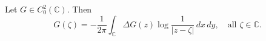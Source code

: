 
Let $G \in C_0^2(\mathbb{C})$. Then
$$G(\zeta) = -\frac{1}{2\pi} \int_{\mathbb{C}} \Delta G(z) \log \frac{1}{|z-\zeta|} \,dx\,dy, \quad \text{all } \zeta \in \mathbb{C}.$$
